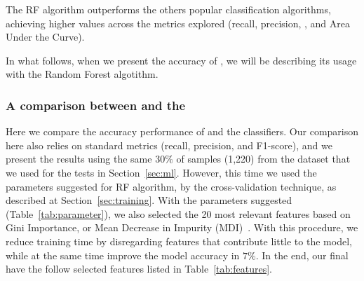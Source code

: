 \begin{finding}
  The RF algorithm outperforms the others popular classification algorithms, achieving higher values across the metrics explored (recall, precision, \fone, and Area Under the Curve).
\end{finding}

In what follows, when we present the accuracy of \droidxpflow, we
will be describing its usage with the Random Forest algotithm.



\subsubsection{A comparison between \droidxpflow and the \mas}\label{sec:comparation}

Here we compare the accuracy performance of \droidxpflow and the \mas classifiers.
Our comparison here also relies on standard metrics
(recall, precision, and F1-score), and we present the results using the
same $30\%$ of samples (1,220) from the \fds dataset that we used for the tests
in Section~\ref{sec:ml}. However, this time we used the parameters suggested for RF algorithm, by the cross-validation technique, as described at Section~\ref{sec:training}. With the parameters suggested (Table~\ref{tab:parameter}), we also selected the 20 most relevant features based on Gini Importance, or Mean Decrease in Impurity (MDI)~\cite{james2023introduction}. With this procedure, we reduce training time by disregarding features that contribute little to the model, while at the same time improve the model accuracy in $7\%$. In the end, our final \fds have the follow selected features listed in Table~\ref{tab:features}.


